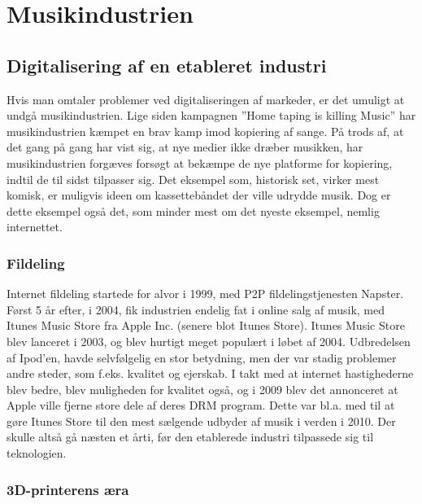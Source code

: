 \chapter{Musikindustrien}

\section{Digitalisering af en etableret industri}

Hvis man omtaler problemer ved digitaliseringen af markeder, er det umuligt at undgå musikindustrien. Lige siden kampagnen ”Home taping is killing Music”\cite{Musik1} har musikindustrien kæmpet en brav kamp imod kopiering af sange. På trods af, at det gang på gang har vist sig, at nye medier ikke dræber musikken, har musikindustrien forgæves forsøgt at bekæmpe de nye platforme for kopiering, indtil de til sidst tilpasser sig. Det eksempel som, historisk set, virker mest komisk, er muligvis ideen om kassettebåndet der ville udrydde musik. Dog er dette eksempel også det, som minder mest om det nyeste eksempel, nemlig internettet.

\subsection{Fildeling}

Internet fildeling startede for alvor i 1999, med P2P\cite{musik2} fildelingstjenesten Napster. Først 5 år efter, i 2004, fik industrien endelig fat i online salg af musik, med Itunes Music Store fra Apple Inc. (senere blot Itunes Store). Itunes Music Store blev lanceret i 2003, og blev hurtigt meget populært i løbet af 2004. Udbredelsen af Ipod’en, havde selvfølgelig en stor betydning, men der var stadig problemer andre steder, som f.eks. kvalitet og ejerskab. I takt med at internet hastighederne blev bedre, blev muligheden for kvalitet også, og i 2009 blev det annonceret at Apple ville fjerne store dele af deres DRM\cite{musik3} program. Dette var bl.a. med til at gøre Itunes Store til den mest sælgende udbyder af musik i verden i 2010.\cite{musik4} Der skulle altså gå næsten et årti, før den etablerede industri tilpassede sig til teknologien. 

\subsection{3D-printerens æra}

